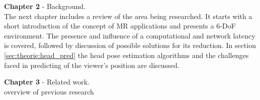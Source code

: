\textbf{Chapter 2} - Background.\\
The next chapter includes a review of the area being researched. It starts with a short introduction of the concept of MR applications and presents a 6-DoF environment. The presence and influence of a computational and network latency is covered, followed by discussion of possible solutions for its reduction. In section \ref{sec:theorie:head_pred} the head pose estimation algorithms and the challenges faced in predicting of the viewer's position are discussed.

\textbf{Chapter 3} - Related work.\\
overview of previous research
